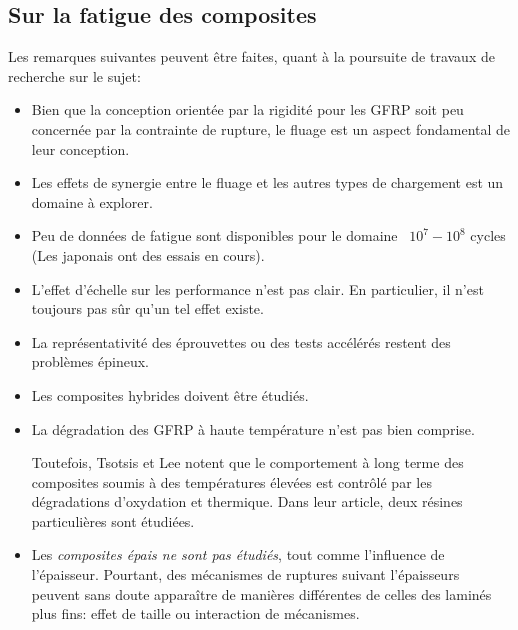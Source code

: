 \medskip
\subsection{Sur la fatigue des composites}
Les remarques suivantes peuvent être faites, quant à la poursuite de
travaux de recherche sur le sujet:
\begin{itemize}
  \item Bien que la conception orientée par la rigidité pour les GFRP
     soit peu concernée par la contrainte de rupture, le fluage
     est un aspect fondamental de leur conception.
  \item Les effets de synergie entre le fluage et les autres types
     de chargement est un domaine à explorer.
  \item Peu de données de fatigue sont disponibles pour le domaine
    ~$10^7-10^8$ cycles (Les japonais ont des essais en cours).
  \item L'effet d'échelle sur les performance n'est pas clair.
     En particulier, il n'est toujours pas sûr qu'un tel effet
     existe.
  \item La représentativité des éprouvettes ou des tests accélérés
     restent des problèmes épineux.
  \item Les composites hybrides doivent être étudiés.
  \item La dégradation des GFRP à haute température n'est pas
     bien comprise.

     Toutefois, Tsotsis et
	 Lee notent que le
     comportement à long terme des composites soumis à des
     températures élevées
     est contrôlé par les dégradations d'oxydation et thermique.
     Dans leur article, deux résines particulières sont étudiées.

  \item Les {\em composites épais ne sont pas étudiés}, tout comme
     l'influence de l'épaisseur.
     Pourtant, des mécanismes de ruptures suivant l'épaisseurs peuvent
     sans doute apparaître de manières différentes de celles des
     laminés plus fins: effet de taille ou interaction de mécanismes.
\end{itemize}
